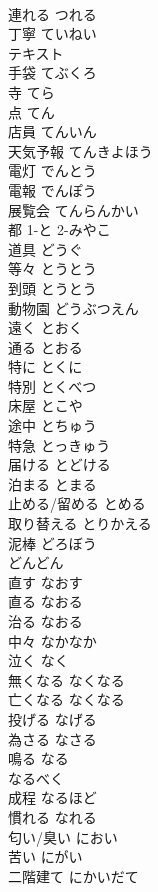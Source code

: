 \documentclass[8pt]{extreport}
\begin{document}
\begin{CJK}{UTF8}{min}
\\	連れる	つれる	
\\	丁寧	ていねい	
\\	テキスト		
\\	手袋	てぶくろ	
\\	寺	てら	
\\	点	てん	
\\	店員	てんいん	
\\	天気予報	てんきよほう	
\\	電灯	でんとう	
\\	電報	でんぽう	
\\	展覧会	てんらんかい	
\\	都	1-と 2-みやこ	
\\	道具	どうぐ	
\\	等々	とうとう	
\\	到頭	とうとう	
\\	動物園	どうぶつえん	
\\	遠く	とおく	
\\	通る	とおる	
\\	特に	とくに	
\\	特別	とくべつ	
\\	床屋	とこや	
\\	途中	とちゅう	
\\	特急	とっきゅう	
\\	届ける	とどける	
\\	泊まる	とまる	
\\	止める/留める	とめる	
\\	取り替える	とりかえる	
\\	泥棒	どろぼう	
\\	どんどん		
\\	直す	なおす	
\\	直る	なおる	
\\	治る	なおる	
\\	中々	なかなか	
\\	泣く	なく	
\\	無くなる	なくなる	
\\	亡くなる	なくなる	
\\	投げる	なげる	
\\	為さる	なさる	
\\	鳴る	なる	
\\	なるべく		
\\	成程	なるほど	
\\	慣れる	なれる	
\\	匂い/臭い	におい	
\\	苦い	にがい	
\\	二階建て	にかいだて	

\end{CJK}
\end{document}
